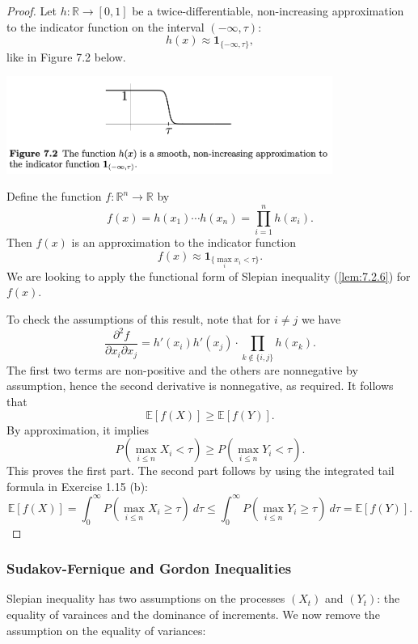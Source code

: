 \begin{proof}
Let $h: \mathbb{R} \to [0, 1]$ be a twice-differentiable, non-increasing approximation to the indicator function 
on the interval $(-\infty, \tau)$: 
\[ h(x) \approx \mathbf{1}_{\{-\infty, \tau\}}, \]
like in Figure 7.2 below.
\begin{center}
    \includegraphics[width=0.8\textwidth]{Chapter 7/fig7-2.png}
\end{center}
Define the function $f: \mathbb{R}^n \to \mathbb{R}$ by 
\[ f(x) = h(x_1) \cdots h(x_n) = \prod_{i = 1}^{n} h(x_i). \]
Then $f(x)$ is an approximation to the indicator function 
\[ f(x) \approx \mathbf{1}_{\{\max_{i}x_i < \tau\}}. \]
We are looking to apply the functional form of Slepian inequality (\cref{lem:7.2.6}) for $f(x)$.

To check the assumptions of this result, note that for $i \neq j$ we have 
\[ \frac{\partial^2 f}{\partial x_i \partial x_j} = h'(x_i) h'(x_j) \cdot \prod_{k \notin \{i, j\}}^{} h(x_k). \]
The first two terms are non-positive and the others are nonnegative by assumption, hence the second derivative 
is nonnegative, as required. It follows that 
\[ \mathbb{E}\left[ f(X) \right] \geq \mathbb{E}\left[ f(Y) \right]. \]
By approximation, it implies 
\[ P \left( \max_{i \leq n} X_i < \tau \right) \geq P \left( \max_{i \leq n} Y_i < \tau \right). \]
This proves the first part. The second part follows by using the integrated tail formula in Exercise 1.15 (b):
\[ \mathbb{E}\left[ f(X) \right] 
= \int_{0}^{\infty} P \left( \max_{i \leq n} X_i \geq \tau \right) \ d \tau 
\leq \int_{0}^{\infty} P \left( \max_{i \leq n} Y_i \geq \tau \right) \ d \tau = \mathbb{E}\left[ f(Y) \right]. \]
\end{proof}


\subsubsection{Sudakov-Fernique and Gordon Inequalities}
Slepian inequality has two assumptions on the processes $(X_t)$ and $(Y_t)$: the equality of varainces and the 
dominance of increments. We now remove the assumption on the equality of variances:

